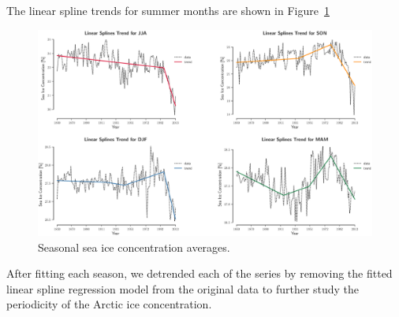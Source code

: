 \documentclass[12pt]{article}
\begin{document}
The linear spline trends for summer months are shown in Figure~\ref{trends}

\begin{figure}[!htbp]
  \includegraphics[width=1\textwidth,center]{figs/trends}
  \caption{Seasonal sea ice concentration averages.}\label{trends}
\end{figure}

After fitting each season, we detrended each of the series by removing the fitted linear spline regression model from the original data to further study the periodicity of the Arctic ice concentration.
\end{document}

